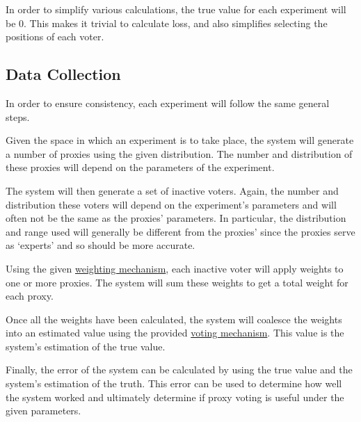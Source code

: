 In order to simplify various calculations, the true value for each experiment
will be 0.
This makes it trivial to calculate loss, and also simplifies selecting the
positions of each voter.


\subsection{Data Collection}\label{subsec:data-collection}
In order to ensure consistency, each experiment will follow the same general
steps.

\begin{enumerate}[label=\textbf{\arabic*}., leftmargin=2\parindent]
    Given the space in which an experiment is to take place, the system will
    generate a number of proxies using the given distribution.
    The number and distribution of these proxies will depend on the
    parameters of the experiment.

    The system will then generate a set of inactive voters.
    Again, the number and distribution these voters will depend on the
    experiment's parameters and will often not be the same as the proxies'
    parameters.
    In particular, the distribution and range used will generally be
    different from the proxies' since the proxies serve as `experts' and so
    should be more accurate.

    Using the given \hyperref[subsec:weight-mechanisms]{weighting mechanism},
    each inactive voter will apply weights to one or more proxies.
    The system will sum these weights to get a total weight for each proxy.

    Once all the weights have been calculated, the system will coalesce
    the weights into an estimated value using the provided
    \hyperref[subsec:voting-mechanisms]{voting mechanism}.
    This value is the system's estimation of the true value.

    Finally, the error of the system can be calculated by using the true
    value and the system's estimation of the truth.
    This error can be used to determine how well the system worked and
    ultimately determine if proxy voting is useful under the given parameters.
\end{enumerate}

